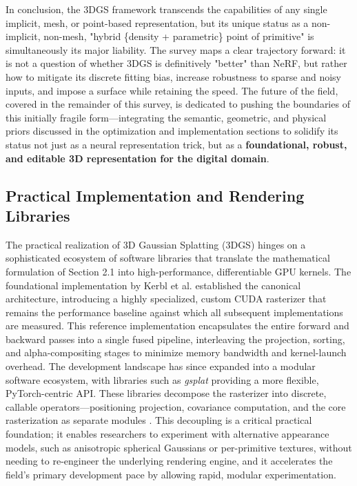 \documentclass[11pt,a4paper]{article}
\begin{document}
In conclusion, the 3DGS framework transcends the capabilities of any single implicit, mesh, or point-based representation, but its unique status as a non-implicit, non-mesh, "hybrid \{density + parametric\} point of primitive" is simultaneously its major liability. The survey maps a clear trajectory forward: it is not a question of whether 3DGS is definitively "better" than NeRF, but rather how to mitigate its discrete fitting bias, increase robustness to sparse and noisy inputs, and impose a surface while retaining the speed. The future of the field, covered in the remainder of this survey, is dedicated to pushing the boundaries of this initially fragile form---integrating the semantic, geometric, and physical priors discussed in the optimization and implementation sections to solidify its status not just as a neural representation trick, but as a \textbf{foundational, robust, and editable 3D representation for the digital domain}.


\subsection{Practical Implementation and Rendering Libraries}


The practical realization of 3D Gaussian Splatting (3DGS) hinges on a sophisticated ecosystem of software libraries that translate the mathematical formulation of Section 2.1 into high-performance, differentiable GPU kernels. The foundational implementation by Kerbl et al. \cite{arxiv:2308.04079v1} established the canonical architecture, introducing a highly specialized, custom CUDA rasterizer that remains the performance baseline against which all subsequent implementations are measured. This reference implementation encapsulates the entire forward and backward passes into a single fused pipeline, interleaving the projection, sorting, and alpha-compositing stages to minimize memory bandwidth and kernel-launch overhead. The development landscape has since expanded into a modular software ecosystem, with libraries such as \emph{gsplat} providing a more flexible, PyTorch-centric API. These libraries decompose the rasterizer into discrete, callable operators---positioning projection, covariance computation, and the core rasterization as separate modules \cite{arxiv:2308.04079v1,arxiv:2401.03890v2}. This decoupling is a critical practical foundation; it enables researchers to experiment with alternative appearance models, such as anisotropic spherical Gaussians \cite{arxiv:2402.15870v1} or per-primitive textures, without needing to re-engineer the underlying rendering engine, and it accelerates the field's primary development pace by allowing rapid, modular experimentation.
\end{document}
